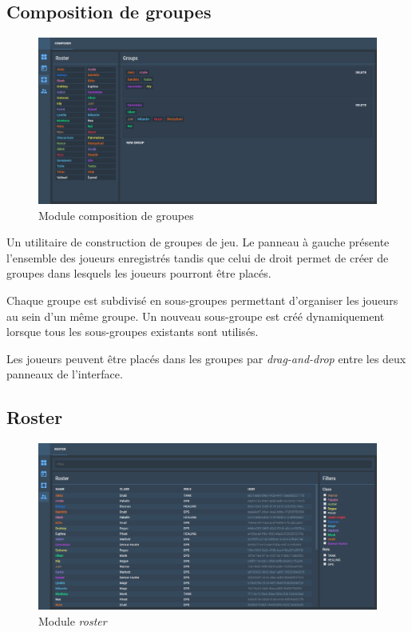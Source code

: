 	\subsection{Composition de groupes}
	\begin{figure}[h]
		\centering
		\includegraphics[width=12cm]{img/composer}
		\caption{Module composition de groupes}
	\end{figure}
	
	Un utilitaire de construction de groupes de jeu. Le panneau à gauche présente l'ensemble des joueurs enregistrés tandis que celui de droit permet de créer de groupes dans lesquels les joueurs pourront être placés.
	
	Chaque groupe est subdivisé en sous-groupes permettant d'organiser les joueurs au sein d'un même groupe. Un nouveau sous-groupe est créé dynamiquement lorsque tous les sous-groupes existants sont utilisés.
	
	Les joueurs peuvent être placés dans les groupes par \emph{drag-and-drop} entre les deux panneaux de l'interface.
	
	\subsection{Roster}
	\begin{figure}[h]
		\centering
		\includegraphics[width=12cm]{img/roster}
		\caption{Module \emph{roster}}
	\end{figure}
	
